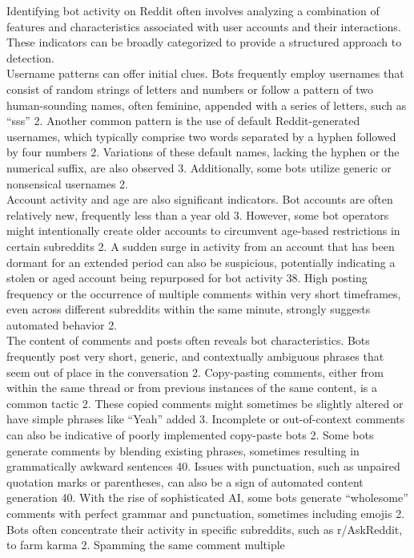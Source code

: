 \documentclass[
  12pt,
  letterpaper,
  DIV=11,
  numbers=noendperiod]{scrartcl}
\begin{document}
Identifying bot activity on Reddit often involves analyzing a
combination of features and characteristics associated with user
accounts and their interactions. These indicators can be broadly
categorized to provide a structured approach to detection.\\
Username patterns can offer initial clues. Bots frequently employ
usernames that consist of random strings of letters and numbers or
follow a pattern of two human-sounding names, often feminine, appended
with a series of letters, such as ``sss'' 2. Another common pattern is
the use of default Reddit-generated usernames, which typically comprise
two words separated by a hyphen followed by four numbers 2. Variations
of these default names, lacking the hyphen or the numerical suffix, are
also observed 3. Additionally, some bots utilize generic or nonsensical
usernames 2.\\
Account activity and age are also significant indicators. Bot accounts
are often relatively new, frequently less than a year old 3. However,
some bot operators might intentionally create older accounts to
circumvent age-based restrictions in certain subreddits 2. A sudden
surge in activity from an account that has been dormant for an extended
period can also be suspicious, potentially indicating a stolen or aged
account being repurposed for bot activity 38. High posting frequency or
the occurrence of multiple comments within very short timeframes, even
across different subreddits within the same minute, strongly suggests
automated behavior 2.\\
The content of comments and posts often reveals bot characteristics.
Bots frequently post very short, generic, and contextually ambiguous
phrases that seem out of place in the conversation 2. Copy-pasting
comments, either from within the same thread or from previous instances
of the same content, is a common tactic 2. These copied comments might
sometimes be slightly altered or have simple phrases like ``Yeah'' added
3. Incomplete or out-of-context comments can also be indicative of
poorly implemented copy-paste bots 2. Some bots generate comments by
blending existing phrases, sometimes resulting in grammatically awkward
sentences 40. Issues with punctuation, such as unpaired quotation marks
or parentheses, can also be a sign of automated content generation 40.
With the rise of sophisticated AI, some bots generate ``wholesome''
comments with perfect grammar and punctuation, sometimes including
emojis 2. Bots often concentrate their activity in specific subreddits,
such as r/AskReddit, to farm karma 2. Spamming the same comment multiple
\end{document}
